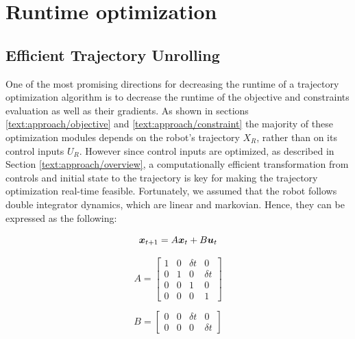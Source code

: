

\section{Runtime optimization}
\label{text:approach/runtime}

\subsection{Efficient Trajectory Unrolling}
\label{text:approach/runtime/unrolling}
One of the most promising directions for decreasing the runtime of a trajectory optimization algorithm is to decrease the runtime of the objective and constraints evaluation as well as their gradients. As shown in sections \ref{text:approach/objective} and \ref{text:approach/constraint} the majority of these optimization modules depends on the robot's trajectory $X_R$, rather than on its control inputs $U_R$. However since control inputs are optimized, as described in Section \ref{text:approach/overview}, a computationally efficient transformation from controls and initial state to the trajectory is key for making the trajectory optimization real-time feasible.
\newline
Fortunately, we assumed that the robot follows double integrator dynamics, which are linear and markovian. Hence, they can be expressed as the following: 

\begin{equation}
\boldsymbol{x}_{t+1} = A \boldsymbol{x}_t + B \boldsymbol{u}_t
\label{eq:dynamics}
\end{equation}

\begin{minipage}{0.5\textwidth}
$$A = \begin{bmatrix} 1 & 0 & \delta t & 0 \\ 0 & 1 & 0 & \delta t \\ 0 & 0 & 1 & 0 \\ 0 & 0 & 0 & 1\end{bmatrix}$$
\end{minipage}
\begin{minipage}{0.5\textwidth}
$$B = \begin{bmatrix} 0 & 0 & \delta t & 0 \\ 0 & 0 & 0 & \delta t \end{bmatrix}$$
\end{minipage}

